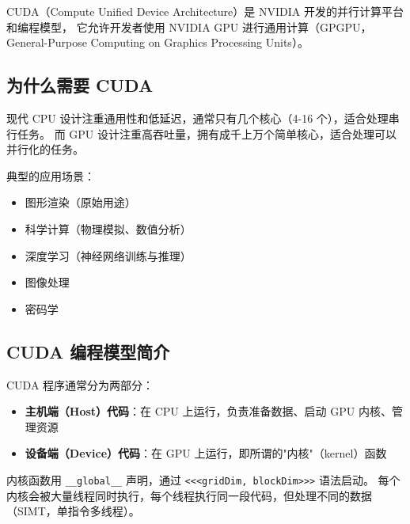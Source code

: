 
CUDA（Compute Unified Device Architecture）是 NVIDIA 开发的并行计算平台和编程模型，
它允许开发者使用 NVIDIA GPU 进行通用计算（GPGPU，General-Purpose Computing on Graphics Processing Units）。

\subsection{为什么需要 CUDA}

现代 CPU 设计注重通用性和低延迟，通常只有几个核心（4-16 个），适合处理串行任务。
而 GPU 设计注重高吞吐量，拥有成千上万个简单核心，适合处理可以并行化的任务。

典型的应用场景：
\begin{itemize}
    \item 图形渲染（原始用途）
    \item 科学计算（物理模拟、数值分析）
    \item 深度学习（神经网络训练与推理）
    \item 图像处理
    \item 密码学
\end{itemize}

\subsection{CUDA 编程模型简介}

CUDA 程序通常分为两部分：
\begin{itemize}
    \item \textbf{主机端（Host）代码}：在 CPU 上运行，负责准备数据、启动 GPU 内核、管理资源
    \item \textbf{设备端（Device）代码}：在 GPU 上运行，即所谓的"内核"（kernel）函数
\end{itemize}

内核函数用 \texttt{\_\_global\_\_} 声明，通过 \texttt{<<<gridDim, blockDim>>>} 语法启动。
每个内核会被大量线程同时执行，每个线程执行同一段代码，但处理不同的数据（SIMT，单指令多线程）。
